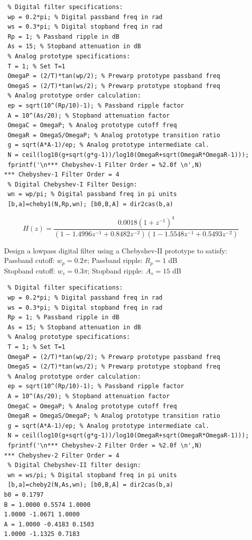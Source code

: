 \documentclass{article}
\begin{document}
\begin{lstlisting}
 % Digital filter specifications:
 wp = 0.2*pi; % Digital passband freq in rad
 ws = 0.3*pi; % Digital stopband freq in rad
 Rp = 1; % Passband ripple in dB
 As = 15; % Stopband attenuation in dB
 % Analog prototype specifications:
 T = 1; % Set T=1
 OmegaP = (2/T)*tan(wp/2); % Prewarp prototype passband freq
 OmegaS = (2/T)*tan(ws/2); % Prewarp prototype stopband freq
 % Analog prototype order calculation:
 ep = sqrt(10^(Rp/10)-1); % Passband ripple factor
 A = 10^(As/20); % Stopband attenuation factor
 OmegaC = OmegaP; % Analog prototype cutoff freq
 OmegaR = OmegaS/OmegaP; % Analog prototype transition ratio
 g = sqrt(A*A-1)/ep; % Analog prototype intermediate cal.
 N = ceil(log10(g+sqrt(g*g-1))/log10(OmegaR+sqrt(OmegaR*OmegaR-1)));
 fprintf('\n*** Chebyshev-1 Filter Order = %2.0f \n',N)
*** Chebyshev-1 Filter Order = 4
 % Digital Chebyshev-I Filter Design:
 wn = wp/pi; % Digital passband freq in pi units
 [b,a]=cheby1(N,Rp,wn); [b0,B,A] = dir2cas(b,a)    
\end{lstlisting}
\begin{center}
    $$H(z)= \frac{0.0018(1+z^{-1})^4}{(1-1.4996z^{-1}+0.8482z^{-2})(1-1.5548z^{-1}+0.5493z^{-2})}$$
\end{center}
Design a lowpass digital filter using a Chebyshev-II prototype to satisfy: \\
\vspace{1em}
Passband cutoff: $w_p=0.2\pi$; Passband ripple: $R_p=1$ dB \\
\vspace{1em}
Stopband cutoff: $w_s=0.3\pi$; Stopband ripple: $A_s =15$ dB \\
\vspace{1em}
\begin{lstlisting}
 % Digital filter specifications:
 wp = 0.2*pi; % Digital passband freq in rad
 ws = 0.3*pi; % Digital stopband freq in rad
 Rp = 1; % Passband ripple in dB
 As = 15; % Stopband attenuation in dB
 % Analog prototype specifications:
 T = 1; % Set T=1
 OmegaP = (2/T)*tan(wp/2); % Prewarp prototype passband freq
 OmegaS = (2/T)*tan(ws/2); % Prewarp prototype stopband freq
 % Analog prototype order calculation:
 ep = sqrt(10^(Rp/10)-1); % Passband ripple factor
 A = 10^(As/20); % Stopband attenuation factor
 OmegaC = OmegaP; % Analog prototype cutoff freq
 OmegaR = OmegaS/OmegaP; % Analog prototype transition ratio
 g = sqrt(A*A-1)/ep; % Analog prototype intermediate cal.
 N = ceil(log10(g+sqrt(g*g-1))/log10(OmegaR+sqrt(OmegaR*OmegaR-1)));
 fprintf('\n*** Chebyshev-2 Filter Order = %2.0f \n',N)
*** Chebyshev-2 Filter Order = 4
 % Digital Chebyshev-II filter design:
 wn = ws/pi; % Digital stopband freq in pi units
 [b,a]=cheby2(N,As,wn); [b0,B,A] = dir2cas(b,a)
b0 = 0.1797
B = 1.0000 0.5574 1.0000
1.0000 -1.0671 1.0000
A = 1.0000 -0.4183 0.1503
1.0000 -1.1325 0.7183
\end{lstlisting}
\end{document}
